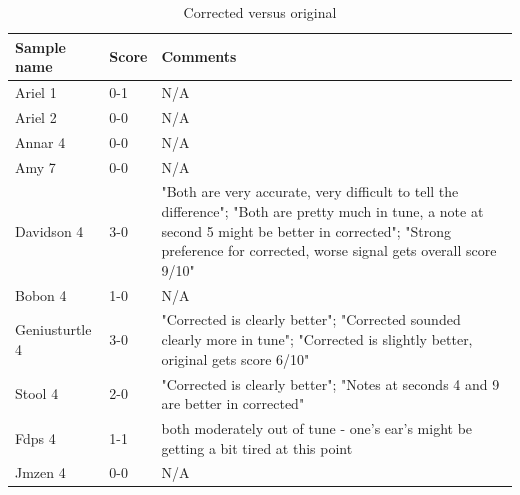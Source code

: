 \begin{table}
  \begin{center}
    \caption{Corrected versus original}
    \label{tab:table1}
    \begin{tabularx}{\columnwidth}{|l|l|X|}
    \hline
\textbf{Sample name} & \textbf{Score} & \textbf{Comments} \\
\hline\hline
Ariel 1 & 0-1 & N/A \\
\hline
Ariel 2 & 0-0 & N/A \\ 
\hline
Annar 4 & 0-0 & N/A \\ 
\hline
Amy 7 & 0-0 & N/A \\
\hline
Davidson 4 & 3-0 & "Both are very accurate, very difficult to tell the difference"; "Both are pretty much in tune, a note at second 5 might be better in corrected"; "Strong preference for corrected, worse signal gets overall score 9/10"\\ 
\hline
Bobon 4 & 1-0 & N/A \\ 
\hline
Geniusturtle 4 & 3-0 & "Corrected is clearly better"; "Corrected sounded clearly more in tune"; "Corrected is slightly better, original gets score 6/10"\\ 
\hline
Stool 4 & 2-0 & "Corrected is clearly better"; "Notes at seconds 4 and 9 are better in corrected" \\ 
\hline
Fdps 4 & 1-1 & both moderately out of tune - one's ear's might be getting a bit tired at this point \\ 
\hline
Jmzen 4 & 0-0 & N/A \\ 
\hline
    \end{tabularx}
  \end{center}
\end{table}





